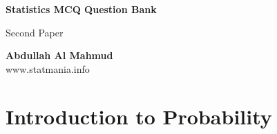 \documentclass{exam}
\begin{document}
\begin{titlepage}
    \begin{center}
        \vspace*{1cm}
            
        \Huge
        \textbf{Statistics MCQ Question Bank}
            
        \vspace{0.5cm}
        \LARGE
        Second Paper \\


            
        \vspace{1.5cm}
            

            
        \vfill
            
            
        \vspace{0.8cm}
            
                    \textbf{Abdullah Al Mahmud} \\
        \Large
        www.statmania.info\\
            
    \end{center}
\end{titlepage}

 \section{Introduction to Probability}
\end{document}

